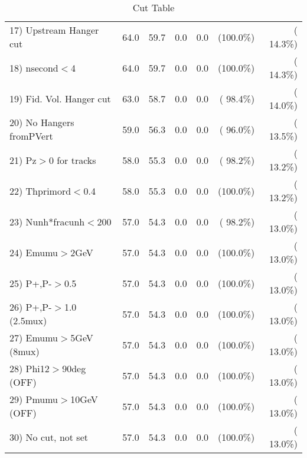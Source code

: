 \begin{table}[h!]
\begin{tabular}{||l||r|r|r|r|r|r||}
 17) Upstream Hanger cut  &         64.0 &         59.7 &          0.0 &          0.0 & (100.0\%) & ( 14.3\%) \\
 18) nsecond$<$4          &         64.0 &         59.7 &          0.0 &          0.0 & (100.0\%) & ( 14.3\%) \\
 19) Fid. Vol. Hanger cut &         63.0 &         58.7 &          0.0 &          0.0 & ( 98.4\%) & ( 14.0\%) \\
 20) No Hangers fromPVert &         59.0 &         56.3 &          0.0 &          0.0 & ( 96.0\%) & ( 13.5\%) \\
 21) Pz$>$0 for tracks    &         58.0 &         55.3 &          0.0 &          0.0 & ( 98.2\%) & ( 13.2\%) \\
 22) Thprimord$<$0.4      &         58.0 &         55.3 &          0.0 &          0.0 & (100.0\%) & ( 13.2\%) \\
 23) Nunh*fracunh$<$200   &         57.0 &         54.3 &          0.0 &          0.0 & ( 98.2\%) & ( 13.0\%) \\
 24) Emumu$>$2GeV         &         57.0 &         54.3 &          0.0 &          0.0 & (100.0\%) & ( 13.0\%) \\
 25) P+,P-$>$0.5          &         57.0 &         54.3 &          0.0 &          0.0 & (100.0\%) & ( 13.0\%) \\
 26) P+,P-$>$1.0 (2.5mux) &         57.0 &         54.3 &          0.0 &          0.0 & (100.0\%) & ( 13.0\%) \\
 27) Emumu$>$5GeV  (8mux) &         57.0 &         54.3 &          0.0 &          0.0 & (100.0\%) & ( 13.0\%) \\
 28) Phi12$>$90deg  (OFF) &         57.0 &         54.3 &          0.0 &          0.0 & (100.0\%) & ( 13.0\%) \\
 29) Pmumu$>$10GeV  (OFF) &         57.0 &         54.3 &          0.0 &          0.0 & (100.0\%) & ( 13.0\%) \\
 30) No cut, not set      &         57.0 &         54.3 &          0.0 &          0.0 & (100.0\%) & ( 13.0\%) \\
 \hline
 \hline
 \end{tabular}
 \caption{Cut Table           }
 \label{tab-cutcohjpsi-mumu_jpsi}
 \end{table}
